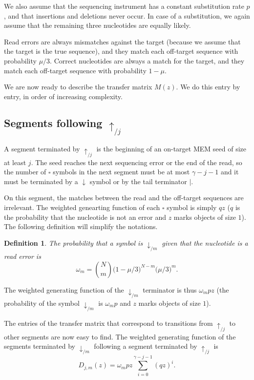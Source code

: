 \documentclass{article}
\newtheorem{definition}{Definition}
\begin{document}
We also assume that the sequencing instrument has a constant substitution
rate $p$, and that insertions and deletions never occur. In case of a
substitution, we again assume that the remaining three nucleotides are
equally likely.

Read errors are always mismatches against the target (because we assume
that the target is the true sequence), and they match each off-target
sequence with probability $\mu/3$. Correct nucleotides are always a match
for the target, and they match each off-target sequence with probability
$1-\mu$.

We are now ready to describe the transfer matrix $M(z)$. We do this entry
by entry, in order of increasing complexity.


\subsection{Segments following $\uparrow_{/j}$}

A segment terminated by $\uparrow_{/j}$ is the beginning of an on-target
MEM seed of size at least $j$. The seed reaches the next sequencing
error or the end of the read, so the number of $\square$ symbols in the
next segment must be at most $\gamma-j-1$ and it must be terminated by a
$\downarrow$ symbol or by the tail terminator $|$.

On this segment, the matches between the read and the off-target sequences
are irrelevant. The weighted genearting function of each $\square$ symbol
is simply $qz$ ($q$ is the probability that the nucleotide is not an error
and $z$ marks objects of size $1$). The following definition will simplify
the notations.

\begin{definition}
The probability that a symbol is $\downarrow_{/m}$ given that the
nucleotide is a read error is
\begin{equation}
\label{eq:omega}
\omega_m = {N \choose m} \big(1 - \mu/3\big)^{N-m} \big(\mu/3\big)^m.
\end{equation}
\end{definition}

The weighted generating function of the $\downarrow_{/m}$ terminator is
thus $\omega_m pz$ (the probability of the symbol $\downarrow_{/m}$ is
$\omega_m p$ and $z$ marks objects of size $1$).

The entries of the transfer matrix that correspond to transitions from
$\uparrow_{/j}$ to other segments are now easy to find. The weighted
generating function of the segments terminated by $\downarrow_{/m}$
following a segment terminated by $\uparrow_{/j}$ is
\begin{equation}
\label{eq:D}
D_{j,m}(z) = \omega_m pz \sum_{i=0}^{\gamma-j-1} (qz)^i.
\end{equation}
\end{document}
